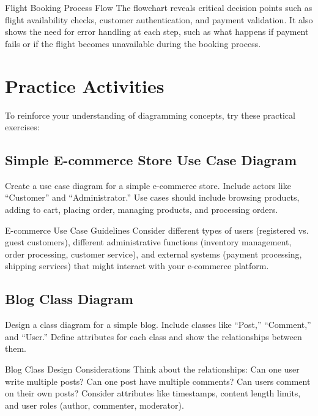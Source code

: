 \begin{examplecard}{Flight Booking Process Flow}
  The flowchart reveals critical decision points such as flight availability checks, customer authentication, and payment validation. It also shows the need for error handling at each step, such as what happens if payment fails or if the flight becomes unavailable during the booking process.
\end{examplecard}

\section{Practice Activities}

To reinforce your understanding of diagramming concepts, try these practical exercises:

\subsection{Simple E-commerce Store Use Case Diagram}

Create a use case diagram for a simple e-commerce store. Include actors like ``Customer'' and ``Administrator.'' Use cases should include browsing products, adding to cart, placing order, managing products, and processing orders.

\begin{examplecard}{E-commerce Use Case Guidelines}
  Consider different types of users (registered vs. guest customers), different administrative functions (inventory management, order processing, customer service), and external systems (payment processing, shipping services) that might interact with your e-commerce platform.
\end{examplecard}

\subsection{Blog Class Diagram}

Design a class diagram for a simple blog. Include classes like ``Post,'' ``Comment,'' and ``User.'' Define attributes for each class and show the relationships between them.

\begin{examplecard}{Blog Class Design Considerations}
  Think about the relationships: Can one user write multiple posts? Can one post have multiple comments? Can users comment on their own posts? Consider attributes like timestamps, content length limits, and user roles (author, commenter, moderator).
\end{examplecard}


